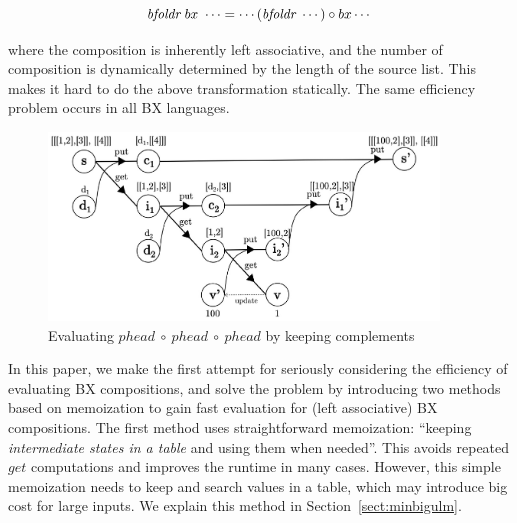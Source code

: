 \vspace{1mm}
\minusvspacetwo
 \[
 \mbox{\it bfoldr}~bx~\cdots = \cdots  (\mbox{\it bfoldr}~\cdots) \circ bx \cdots
 \]
 \minusvspacetwo

\noindent where the composition is inherently left associative, and the number of composition is dynamically determined by the length of the source list. This makes it hard to do the above transformation statically. The same efficiency problem occurs in all BX languages.



\begin{figure}[!t]
  \centering
  \includegraphics[height=5cm]{./fig/fig3.eps}
  \vspace{-0.25cm}
  \caption{Evaluating $phead \ \circ \ phead \ \circ \ phead$ by keeping complements}
  \vspace{-0.5cm}
  \label{fig:eval-comp-phead-2}
\end{figure}


In this paper, we make the first attempt for seriously considering the efficiency of evaluating BX compositions, and
solve the problem by introducing two methods based on memoization to gain fast evaluation for (left associative) BX compositions.
The first method uses straightforward memoization: ``keeping \emph{intermediate states in a table} and using them when needed''. This avoids repeated $get$ computations and improves the runtime in many cases. However, this simple memoization needs to keep and search values in a table, which may introduce big cost for large inputs. We explain this method in Section~\ref{sect:minbigulm}.

